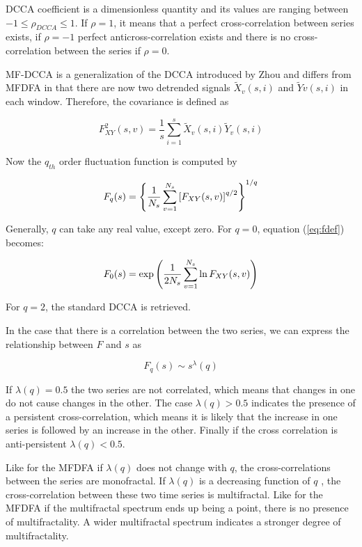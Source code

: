 \documentclass[onecolumn, preprint,aps,amsmath, amssymb, superscriptaddress]{revtex4}
\begin{document}
DCCA coefficient is a dimensionless quantity and its
values are ranging between $-1 \leq \rho_{DCCA} \leq 1$. If $\rho = 1$, it means that a perfect cross-correlation between series exists, if $\rho = -1$ perfect anticross-correlation exists and there is no cross-correlation between the series if $\rho = 0$. 

MF-DCCA is a generalization of the DCCA introduced by Zhou \cite{Zhou} and differs from MFDFA in that there are now two detrended signals  $\tilde{X}_v(s,i)$ and $\tilde{Y}v(s,i)$ in each window. Therefore, the covariance is defined as

\begin{equation}
F_{XY}^2 (s,v)=\frac{1}{s} \sum_{i=1}^s\tilde{X}_v(s,i)\tilde{Y}_v(s,i)
\end{equation}

Now the $q_{th}$ order fluctuation function is computed by

\begin{equation}
F_q(s) =\left\{ {1 \over  N_s} \sum_{v=1}^{ N_s} \left[ F_{XY}(s,v)
\right]^{q/2} \right\}^{1/q} \label{eq:fdef}
\end{equation}

Generally, $q$ can take any real value, except zero. For $q=0$, equation (\ref{eq:fdef}) becomes:

\begin{equation}
F_0(s)= \exp\left( {1 \over  2N_s} \sum_{v=1}^{ N_s}\ln F_{XY}(s,v)\right
) \label{eq:fdef0}
\end{equation}

For $q=2$, the standard DCCA is retrieved.

In the case that there is a correlation between the two series, we can express the relationship between $F$ and $s$ as

\begin{equation}
F_q(s) \sim s^\lambda(q)
\end{equation}

If $\lambda(q)=0.5$ the two series are not correlated, which means that changes in one do not cause changes in the other. The case $\lambda(q) > 0.5$ indicates the presence of a persistent cross-correlation, which means it is likely that the increase in one series is followed by an increase in the other. Finally if the cross correlation is anti-persistent $\lambda(q) < 0.5$.

Like for the MFDFA if $\lambda(q)$ does not change with $q$, the cross-correlations between the series are monofractal. If $\lambda(q)$ is a decreasing function of $q$ , the cross-correlation between these two time series is multifractal. Like for the MFDFA if the multifractal spectrum ends up being a point, there is no presence of multifractality. A wider multifractal spectrum indicates a stronger degree of multifractality.
\end{document}
